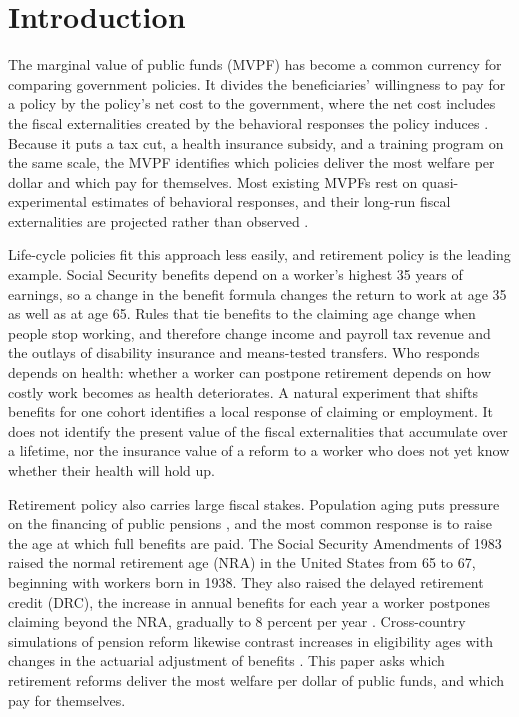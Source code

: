 \section{Introduction}
\label{sec:intro}

The marginal value of public funds (MVPF) has become a common currency for comparing government policies. It divides the beneficiaries' willingness to pay for a policy by the policy's net cost to the government, where the net cost includes the fiscal externalities created by the behavioral responses the policy induces \citep{hendren2016policy,hendren2020unified}. Because it puts a tax cut, a health insurance subsidy, and a training program on the same scale, the MVPF identifies which policies deliver the most welfare per dollar and which pay for themselves. Most existing MVPFs rest on quasi-experimental estimates of behavioral responses, and their long-run fiscal externalities are projected rather than observed \citep{hendren2020unified,Finkelstein2020welfare}.

Life-cycle policies fit this approach less easily, and retirement policy is the leading example. Social Security benefits depend on a worker's highest 35 years of earnings, so a change in the benefit formula changes the return to work at age 35 as well as at age 65. Rules that tie benefits to the claiming age change when people stop working, and therefore change income and payroll tax revenue and the outlays of disability insurance and means-tested transfers. Who responds depends on health: whether a worker can postpone retirement depends on how costly work becomes as health deteriorates. A natural experiment that shifts benefits for one cohort identifies a local response of claiming or employment. It does not identify the present value of the fiscal externalities that accumulate over a lifetime, nor the insurance value of a reform to a worker who does not yet know whether their health will hold up.

Retirement policy also carries large fiscal stakes. Population aging puts pressure on the financing of public pensions \citep{trustees2024,cbo2024socialsecurity}, and the most common response is to raise the age at which full benefits are paid. The Social Security Amendments of 1983 raised the normal retirement age (NRA) in the United States from 65 to 67, beginning with workers born in 1938. They also raised the delayed retirement credit (DRC), the increase in annual benefits for each year a worker postpones claiming beyond the NRA, gradually to 8 percent per year \citep{Svahn1983social,diamond1999social}. Cross-country simulations of pension reform likewise contrast increases in eligibility ages with changes in the actuarial adjustment of benefits \citep{gruber2009social}. This paper asks which retirement reforms deliver the most welfare per dollar of public funds, and which pay for themselves.

